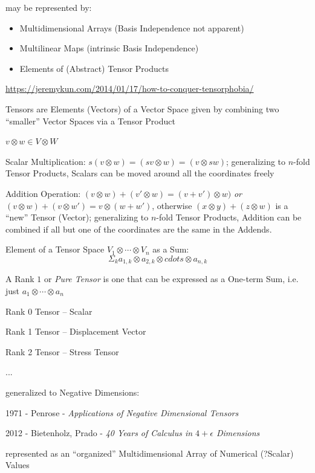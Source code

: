 {may be represented by:
\begin{itemize}
  \item Multidimensional Arrays (Basis Independence not apparent)
  \item Multilinear Maps (intrinsic Basis Independence)
  \item Elements of (Abstract) Tensor Products
\end{itemize}

\fist
\url{https://jeremykun.com/2014/01/17/how-to-conquer-tensorphobia/}

Tensors are Elements (Vectors) of a Vector Space given by
combining two ``smaller'' Vector Spaces via a Tensor Product

$v \otimes w \in V \otimes W$

Scalar Multiplication: $s(v \otimes w) = (sv \otimes w) = (v \otimes
sw)$; generalizing to  $n$-fold Tensor Products, Scalars can be moved
around all the coordinates freely

Addition Operation: $(v \otimes w) + (v' \otimes w) = (v + v') \otimes
w)$ \emph{or} $(v \otimes w) + (v \otimes w') = v \otimes (w + w')$,
otherwise $(x \otimes y) + (z \otimes w)$ is a ``new'' Tensor
(Vector); generalizing to $n$-fold Tensor Products, Addition can be
combined if all but one of the coordinates are the same in the
Addends.

Element of a Tensor Space $V_1 \otimes \cdots \otimes V_n$ as a Sum:
\[
  \Sigma_k a_{1,k} \otimes a_{2,k} \otimes cdots \otimes a_{n,k}
\]

A Rank $1$ or \emph{Pure Tensor} is one that can be expressed as a
One-term Sum, i.e. just $a_1 \otimes \cdots \otimes a_n$

\asterism

Rank 0 Tensor -- Scalar

Rank 1 Tensor -- Displacement Vector

Rank 2 Tensor -- Stress Tensor

...


\asterism

generalized to Negative Dimensions:

1971 - Penrose - \emph{Applications of Negative Dimensional Tensors}

2012 - Bietenholz, Prado - \emph{40 Years of Calculus in $4 + \epsilon$
  Dimensions}


\asterism


represented as an ``organized'' Multidimensional Array of Numerical
(?Scalar) Values

}
